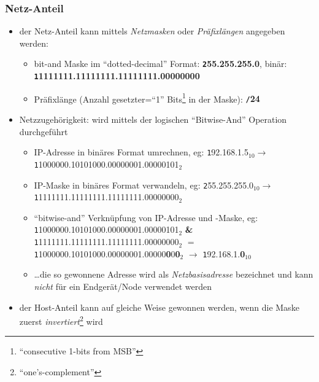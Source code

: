 \documentclass{beamer}
\begin{document}
\begin{frame}
\frametitle{Netz-Anteil}
\begin{itemize}
	\item{der Netz-Anteil kann mittels {\em Netzmasken} oder {\em Pr\"afixl\"angen} angegeben werden:}
	\begin{itemize}
	\item{{\tiny bit-and Maske im ``dotted-decimal'' Format: {\textbf {\texttt 255.255.255.0}}, bin\"ar: {\textbf {\texttt 11111111.11111111.11111111.00000000}}}}
	\item{{\tiny Pr\"afixl\"ange (Anzahl gesetzter=``1'' Bits\footnote{``consecutive 1-bits from MSB''} in der Maske): {\textbf {\texttt /24}}}}
\end{itemize}
\item{Netzzugeh\"origkeit: wird mittels der logischen ``Bitwise-And'' Operation durchgef\"uhrt}
\begin{itemize}
	\item{{\tiny IP-Adresse in bin\"ares Format umrechnen, eg: {\texttt 192.168.1.5}$_{10}$$\rightarrow${\texttt 11000000.10101000.00000001.00000101}$_{2}$}}
	\item{{\tiny IP-Maske in bin\"ares Format verwandeln, eg: {\texttt 255.255.255.0}$_{10}$$\rightarrow${\texttt 11111111.11111111.11111111.00000000}$_{2}$}}
	\item{{\tiny ``bitwise-and'' Verkn\"upfung von IP-Adresse und -Maske, eg:\\{\texttt 11000000.10101000.00000001.00000101}$_{2}$ {\textbf \&} {\texttt 11111111.11111111.11111111.00000000}$_{2}$ $=$\\{\texttt 11000000.10101000.00000001.00000{\textbf 0}0{\textbf 0}}$_{2}$ $\rightarrow$ {\texttt 192.168.1.{\textbf 0}}$_{10}$
	}} 
	\item{{\tiny \ldots die so gewonnene Adresse wird als {\em Netzbasisadresse} bezeichnet und kann {\em nicht} f\"ur ein Endger\"at/Node verwendet werden}}
\end{itemize}
\item{der Host-Anteil kann auf gleiche Weise gewonnen werden, wenn die Maske zuerst {\em invertiert}\footnote{``one's-complement''} wird}
\end{itemize}
\end{frame}
\end{document}
